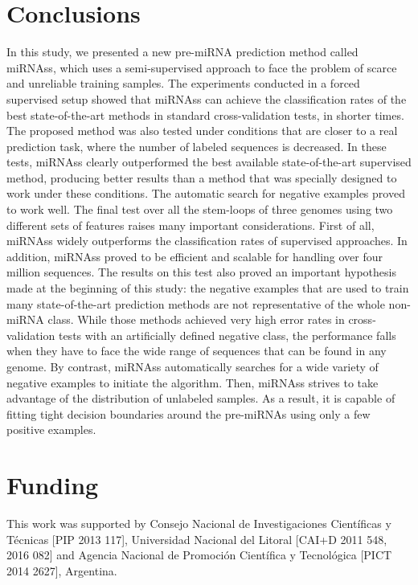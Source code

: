 \documentclass{article}
\begin{document}
\section{Conclusions} \label{sec:conclusions}
In this study, we presented a new pre-miRNA prediction method called miRNAss, which uses a semi-supervised approach to face the problem of scarce and unreliable training samples. The experiments conducted in a forced supervised setup showed that miRNAss can achieve the classification rates of the best state-of-the-art methods in standard cross-validation tests, in shorter times. The proposed method was also tested under conditions that are closer to a real prediction task, where the number of labeled sequences is decreased. In these tests, miRNAss clearly outperformed the best available state-of-the-art supervised method, producing better results than a method that was specially designed to work under these conditions. The automatic search for negative examples proved to work well. 
The final test over all the stem-loops of three genomes using two different sets of features raises many important considerations. First of all, miRNAss widely outperforms the classification rates of supervised approaches. In addition, miRNAss proved to be efficient and scalable for handling over four million sequences. The results on this test also proved an important hypothesis made at the beginning of this study: the negative examples that are used to train many state-of-the-art prediction methods are not representative of the whole non-miRNA class. While those methods achieved very high error rates in cross-validation tests with an artificially defined negative class, the performance falls when they have to face the wide range of sequences that can be found in any genome. By contrast, miRNAss automatically searches for a wide variety of negative examples to initiate the algorithm. Then, miRNAss strives to take advantage of the distribution of unlabeled samples. As a result, it is capable of fitting tight decision boundaries around the pre-miRNAs using only a few positive examples.

\section*{Funding}
This work was supported by Consejo Nacional de Investigaciones Cient\'ificas y T\'ecnicas [PIP 2013 117], Universidad Nacional del Litoral [CAI+D 2011 548, 2016 082] and Agencia Nacional de Promoci\'on Cient\'ifica y Tecnol\'ogica [PICT 2014 2627], Argentina.




\end{document}
